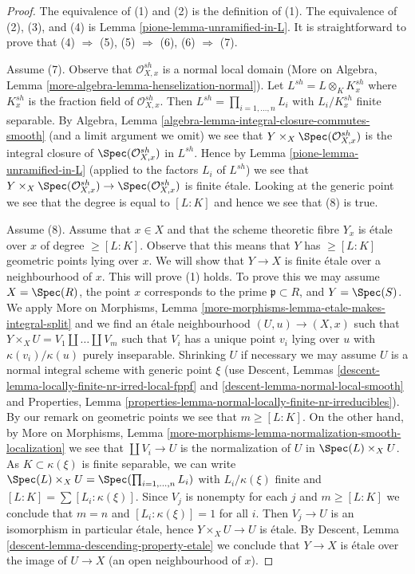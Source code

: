 \begin{proof}

The equivalence of (1) and (2) is the definition of (1).
The equivalence of (2), (3), and (4) is Lemma \ref{pione-lemma-unramified-in-L}.
It is straightforward to prove that (4) $\Rightarrow$ (5),
(5) $\Rightarrow$ (6), (6) $\Rightarrow$ (7).

\medskip\noindent
Assume (7). Observe that $\mathcal{O}_{X, x}^{sh}$ is a normal local domain
(More on Algebra, Lemma \ref{more-algebra-lemma-henselization-normal}).
Let $L^{sh} = L \otimes_K K_x^{sh}$ where $K_x^{sh}$ is the fraction field
of $\mathcal{O}_{X, x}^{sh}$. Then $L^{sh} = \prod_{i = 1, \ldots, n} L_i$
with $L_i/K_x^{sh}$ finite separable. By
Algebra, Lemma \ref{algebra-lemma-integral-closure-commutes-smooth}
(and a limit argument we omit)
we see that $Y \times_X \Spec(\mathcal{O}_{X, x}^{sh})$
is the integral closure of $\Spec(\mathcal{O}_{X, x}^{sh})$ in $L^{sh}$.
Hence by Lemma \ref{pione-lemma-unramified-in-L} (applied to the factors
$L_i$ of $L^{sh}$) we see that
$Y \times_X \Spec(\mathcal{O}_{X, x}^{sh}) \to \Spec(\mathcal{O}_{X, x}^{sh})$
is finite \'etale. Looking at the generic point we see that
the degree is equal to $[L : K]$ and hence we see that (8) is true.

\medskip\noindent
Assume (8). Assume that $x \in X$ and that the scheme theoretic fibre $Y_x$
is \'etale over $x$ of degree $\geq [L : K]$. Observe that this means
that $Y$ has $\geq [L : K]$ geometric points lying over $x$.
We will show that $Y \to X$ is finite \'etale over a neighbourhood of $x$.
This will prove (1) holds.
To prove this we may assume $X = \Spec(R)$, the point $x$ corresponds to
the prime $\mathfrak p \subset R$, and $Y = \Spec(S)$. We apply
More on Morphisms,
Lemma \ref{more-morphisms-lemma-etale-makes-integral-split} and we find an
\'etale neighbourhood $(U, u) \to (X, x)$ such that
$Y \times_X U = V_1 \amalg \ldots \amalg V_m$ such that $V_i$
has a unique point $v_i$ lying over $u$ with $\kappa(v_i)/\kappa(u)$
purely inseparable. Shrinking $U$ if necessary we may assume $U$ is
a normal integral scheme with generic point $\xi$ (use
Descent, Lemmas \ref{descent-lemma-locally-finite-nr-irred-local-fppf} and
\ref{descent-lemma-normal-local-smooth} and
Properties, Lemma \ref{properties-lemma-normal-locally-finite-nr-irreducibles}).
By our remark on geometric points we see that $m \geq [L : K]$.
On the other hand, by More on Morphisms, Lemma
\ref{more-morphisms-lemma-normalization-smooth-localization}
we see that $\coprod V_i \to U$ is the normalization of $U$ in
$\Spec(L) \times_X U$. As $K \subset \kappa(\xi)$ is finite separable,
we can write $\Spec(L) \times_X U = \Spec(\prod_{i = 1, \ldots, n} L_i)$
with $L_i/\kappa(\xi)$ finite and $[L : K] = \sum [L_i : \kappa(\xi)]$.
Since $V_j$ is nonempty for each $j$ and $m \geq [L : K]$
we conclude that $m = n$ and $[L_i : \kappa(\xi)] = 1$
for all $i$. Then $V_j \to U$ is an isomorphism in particular
\'etale, hence $Y \times_X U \to U$ is \'etale. By
Descent, Lemma \ref{descent-lemma-descending-property-etale}
we conclude that $Y \to X$ is \'etale over the
image of $U \to X$ (an open neighbourhood of $x$).


\end{proof}
